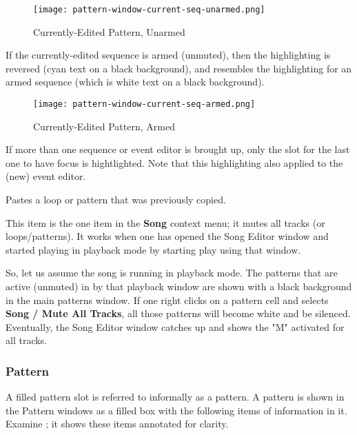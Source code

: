 \begin{figure}[H]
   \centering 
   \texttt{[image: pattern-window-current-seq-unarmed.png]}
   \caption{Currently-Edited Pattern, Unarmed}
   \label{fig:pattern_window_current_seq_unarmed}
\end{figure}

   If the currently-edited sequence is armed (unmuted), then the highlighting
   is reversed (cyan text on a black background), and resembles the
   highlighting for an armed sequence (which is white text on a black
   background).

\begin{figure}[H]
   \centering 
   \texttt{[image: pattern-window-current-seq-armed.png]}
   \caption{Currently-Edited Pattern, Armed}
   \label{fig:pattern_window_current_seq_armed}
\end{figure}

   If more than one sequence or event editor is brought up, only the slot for
   the last one to have focus is hightlighted.
   Note that this highlighting also applied to the (new) event editor.

   Pastes a loop or pattern that was previously copied.

   This item is the one item in the \textbf{Song} context menu;
   it mutes all tracks (or loops/patterns).
   It works when one has opened the Song Editor window
   and started playing in playback
   mode by starting play using that window.

   So, let us assume the song is running in playback mode.  The patterns that
   are active (unmuted) in by that playback window are shown with a black
   background in the main patterns window.  If one right clicks on a pattern
   cell and selects \textbf{Song / Mute All Tracks}, all those patterns
   will become white and be silenced.  Eventually, the Song Editor window
   catches up and shows the "M" activated for all tracks.
   
\subsubsection{Pattern}
\label{subsubsec:seq64_patterns_pattern_filled}

   A filled pattern slot is referred to informally as a pattern.
   A pattern is shown in the Pattern windows as a filled box with the
   following items of information in it.
   Examine ; it shows
   these items annotated for clarity.

